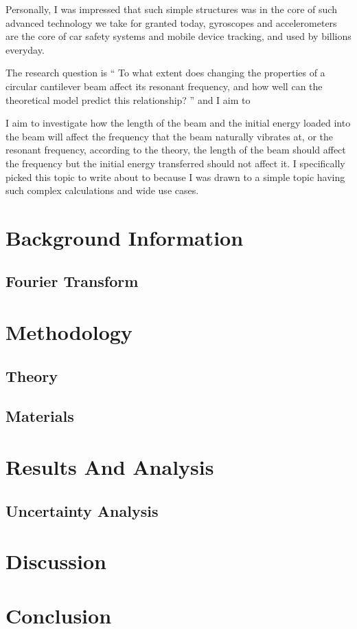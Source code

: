 \documentclass[a4paper,12pt]{article}
\begin{document}
    Personally, I was impressed that such simple structures was in the core of such advanced technology we take for granted today, gyroscopes and accelerometers are the core of car safety systems and mobile device tracking, and used by billions everyday.

        The research question is `` To what extent does changing the properties of a circular cantilever beam affect its resonant frequency, and how well can the theoretical model predict this relationship? '' and I aim to

    I aim to investigate how the length of the beam and the initial energy loaded into the beam will affect the frequency that the beam naturally vibrates at, or the resonant frequency, according to the theory,  the length of the beam should affect the frequency but the initial energy transferred should not affect it.
    I specifically picked this topic to write about to because I was drawn to a simple topic having such complex calculations and wide use cases.

\section{Background Information}%
    \subsection{Fourier Transform}

\section{Methodology}%
    \subsection{Theory}

    \subsection{Materials}


\section{Results And Analysis}%
    \subsection{Uncertainty Analysis}

\section{Discussion}%

\section{Conclusion}%

\printbibliography
\end{document}

